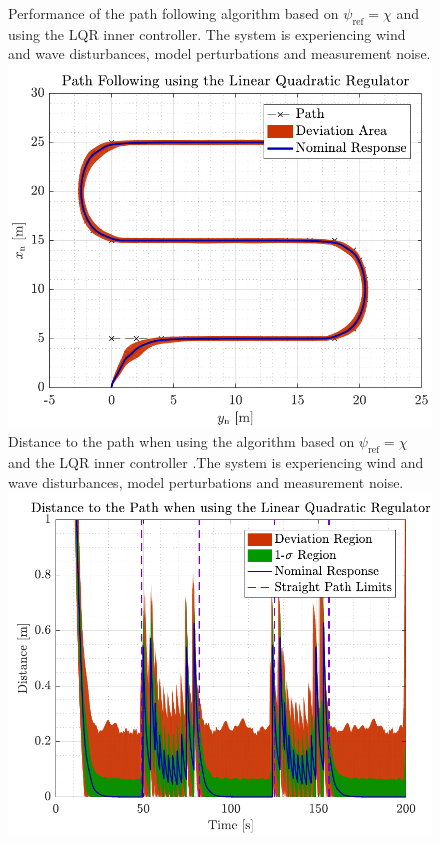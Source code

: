 \begin{figure}[H]
	\captionbox  %
	{  
		Performance of the path following algorithm based on $\psi_\mathrm{ref}=\chi$ and using the LQR inner controller. The system is experiencing wind and wave disturbances, model perturbations and measurement noise.\label{fig:lqrwrong}                                
	}                                                                 
	{                                                                  
		\includegraphics[width=.45\textwidth]{figures/path_lqr_no_correc}         
	}                                                                    
	\hspace{5pt}                                                  
	\captionbox
	{       
		Distance to the path when using the algorithm based on $\psi_\mathrm{ref}=\chi$ and the LQR inner controller .The system is experiencing wind and wave disturbances, model perturbations and measurement noise.
		\label{fig:distlqrwrong}                               
	}                                                                  
	{                                                                    
		\includegraphics[width=.45\textwidth]{figures/dist_lqr_no_correc}         
	}                                                                         
\end{figure}
